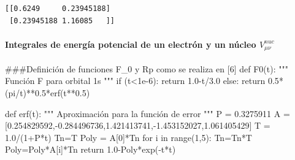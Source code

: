 \documentclass[
  letterpaper,
  DIV=11,
  numbers=noendperiod]{scrreprt}
\let\oldparagraph\paragraph
\renewcommand{\paragraph}[1]{\oldparagraph{#1}\mbox{}}
\newenvironment{Shaded}{\begin{snugshade}}{\end{snugshade}}
\newcommand{\BuiltInTok}[1]{\textcolor[rgb]{0.00,0.23,0.31}{#1}}
\newcommand{\CommentTok}[1]{\textcolor[rgb]{0.37,0.37,0.37}{#1}}
\newcommand{\ControlFlowTok}[1]{\textcolor[rgb]{0.00,0.23,0.31}{#1}}
\newcommand{\DecValTok}[1]{\textcolor[rgb]{0.68,0.00,0.00}{#1}}
\newcommand{\FloatTok}[1]{\textcolor[rgb]{0.68,0.00,0.00}{#1}}
\newcommand{\KeywordTok}[1]{\textcolor[rgb]{0.00,0.23,0.31}{#1}}
\newcommand{\NormalTok}[1]{\textcolor[rgb]{0.00,0.23,0.31}{#1}}
\newcommand{\OperatorTok}[1]{\textcolor[rgb]{0.37,0.37,0.37}{#1}}
\begin{document}
\begin{verbatim}
[[0.6249     0.23945188]
 [0.23945188 1.16085   ]]
\end{verbatim}

\hypertarget{integrales-de-energuxeda-potencial-de-un-electruxf3n-y-un-nuxfacleo-vnuc_mu-nu-1}{%
\paragraph{\texorpdfstring{Integrales de energía potencial de un
electrón y un núcleo
\(V^{nuc}_{\mu \nu}\)}{Integrales de energía potencial de un electrón y un núcleo V\^{}\{nuc\}\_\{\textbackslash mu \textbackslash nu\}}}\label{integrales-de-energuxeda-potencial-de-un-electruxf3n-y-un-nuxfacleo-vnuc_mu-nu-1}}

\begin{Shaded}
\begin{Highlighting}[]
\CommentTok{\#\#\#Definición de funciones F\_0 y Rp como se realiza en [6]}
\KeywordTok{def}\NormalTok{ F0(t):}
    \CommentTok{"""}
\CommentTok{    Función F para orbital 1s}
\CommentTok{    """}
    \ControlFlowTok{if}\NormalTok{ (t}\OperatorTok{\textless{}}\FloatTok{1e{-}6}\NormalTok{):}
        \ControlFlowTok{return} \FloatTok{1.0}\OperatorTok{{-}}\NormalTok{t}\OperatorTok{/}\FloatTok{3.0}
    \ControlFlowTok{else}\NormalTok{:}
        \ControlFlowTok{return} \FloatTok{0.5}\OperatorTok{*}\NormalTok{(pi}\OperatorTok{/}\NormalTok{t)}\OperatorTok{**}\FloatTok{0.5}\OperatorTok{*}\NormalTok{erf(t}\OperatorTok{**}\FloatTok{0.5}\NormalTok{)}
    
\KeywordTok{def}\NormalTok{ erf(t):}
    \CommentTok{"""}
\CommentTok{    Aproximación para la función de error}
\CommentTok{    """}
\NormalTok{    P }\OperatorTok{=} \FloatTok{0.3275911}
\NormalTok{    A }\OperatorTok{=}\NormalTok{ [}\FloatTok{0.254829592}\NormalTok{,}\OperatorTok{{-}}\FloatTok{0.284496736}\NormalTok{,}\FloatTok{1.421413741}\NormalTok{,}\OperatorTok{{-}}\FloatTok{1.453152027}\NormalTok{,}\FloatTok{1.061405429}\NormalTok{]}
\NormalTok{    T }\OperatorTok{=} \FloatTok{1.0}\OperatorTok{/}\NormalTok{(}\DecValTok{1}\OperatorTok{+}\NormalTok{P}\OperatorTok{*}\NormalTok{t)}
\NormalTok{    Tn}\OperatorTok{=}\NormalTok{T}
\NormalTok{    Poly }\OperatorTok{=}\NormalTok{ A[}\DecValTok{0}\NormalTok{]}\OperatorTok{*}\NormalTok{Tn}
    \ControlFlowTok{for}\NormalTok{ i }\KeywordTok{in} \BuiltInTok{range}\NormalTok{(}\DecValTok{1}\NormalTok{,}\DecValTok{5}\NormalTok{):}
\NormalTok{        Tn}\OperatorTok{=}\NormalTok{Tn}\OperatorTok{*}\NormalTok{T}
\NormalTok{        Poly}\OperatorTok{=}\NormalTok{Poly}\OperatorTok{*}\NormalTok{A[i]}\OperatorTok{*}\NormalTok{Tn}
    \ControlFlowTok{return} \FloatTok{1.0}\OperatorTok{{-}}\NormalTok{Poly}\OperatorTok{*}\NormalTok{exp(}\OperatorTok{{-}}\NormalTok{t}\OperatorTok{*}\NormalTok{t)}
\end{Highlighting}
\end{Shaded}
\end{document}
